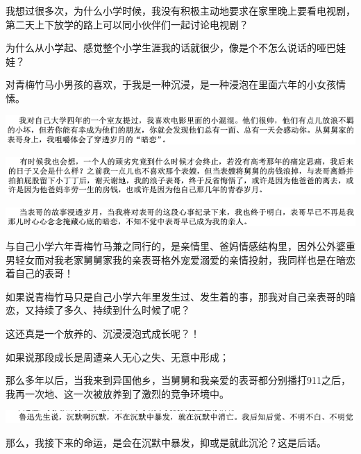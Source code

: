 \documentclass[9pt, b5paper]{article}
\begin{document}
我想过很多次，为什么小学时候，我没有积极主动地要求在家里晚上要看电视剧，第二天上下放学的路上可以同小伙伴们一起讨论电视剧？

为什么从小学起、感觉整个小学生涯我的话就很少，像是个不怎么说话的哑巴娃娃？

对青梅竹马小男孩的喜欢，于我是一种沉浸，是一种浸泡在里面六年的小女孩情愫。

\begin{center}
\includegraphics[width=.9\linewidth]{./pic/backups_plans_20210422_112117.png}
\end{center}

\begin{center}
\includegraphics[width=.9\linewidth]{./pic/backups_plans_20210422_112135.png}
\end{center}

\begin{center}
\includegraphics[width=.9\linewidth]{./pic/backups_plans_20210422_112152.png}
\end{center}

与自己小学六年青梅竹马兼之同行的，是亲情里、爸妈情感结构里，因外公外婆重男轻女而对我老家舅舅家我的亲表哥格外宠爱溺爱的亲情投射，我同样也是在暗恋着自己的表哥！

如果说青梅竹马只是自己小学六年里发生过、发生着的事，那我对自己亲表哥的暗恋，又持续了多久、持续到什么时候了呢？

这还真是一个放养的、沉浸浸泡式成长呢？！

如果说那段成长是周遭亲人无心之失、无意中形成；

那么多年以后，当我来到异国他乡，当舅舅和我亲爱的表哥都分别播打911之后，我再一次地、这一次被放养到了激烈的竞争环境中。

\begin{center}
\includegraphics[width=.9\linewidth]{./pic/backups_plans_20210422_121139.png}
\end{center}

那么，我接下来的命运，是会在沉默中暴发，抑或是就此沉沦？这是后话。
\end{document}
